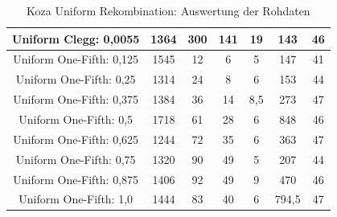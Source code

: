 \begin{table}[H]
\begin{tabular}{c | c | c | c | c | c | c}
		\hline
		Uniform Clegg: 0,0055 & 1364 & 300 & 141 & 19 & 143 & 46\\
		\hline
		Uniform One-Fifth: 0,125 & 1545 & 12 & 6 & 5 & 147 & 41\\
		\hline
		Uniform One-Fifth: 0,25 & 1314 & 24 & 8 & 6 & 153 & 44\\
		\hline
		Uniform One-Fifth: 0,375 & 1384 & 36 & 14 & 8,5 & 273 & 47\\
		\hline
		Uniform One-Fifth: 0,5 & 1718 & 61 & 28 & 6 & 848 & 46\\
		\hline
		Uniform One-Fifth: 0,625 & 1244 & 72 & 35 & 6 & 363 & 47\\
		\hline
		Uniform One-Fifth: 0,75 & 1320 & 90 & 49 & 5 & 207 & 44\\
		\hline
		Uniform One-Fifth: 0,875 & 1406 & 92 & 49 & 9 & 470 & 46\\
		\hline
		Uniform One-Fifth: 1,0 & 1444 & 83 & 40 & 6 & 794,5 & 47\\
	\end{tabular}
	\caption{Koza Uniform Rekombination: Auswertung der Rohdaten}
	\label{table:kozaUniformRohdaten}
\end{table}

